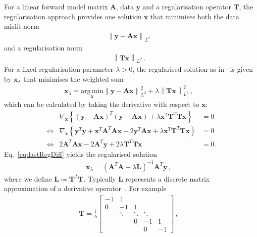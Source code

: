 For a linear forward model matrix $\bm{A}$, data $\bm{y}$ and a regularisation operator $\bm{T}$, the regularisation approach provides one solution $\bm{x}$ that minimises both the data misfit norm
\begin{align}
	\left\lVert \bm{y} - \bm{A} \bm{x} \right\rVert_{L^2}
\end{align} and a regularisation norm 
\begin{align}
	\left\lVert \bm{T} \bm{x} \right\rVert_{L^2} \, . \label{semiNorm}
\end{align}
For a fixed regularisation parameter $\lambda> 0 $, the regularised solution as in~\cite{hansen2010discrete, fox2016fast, tan2016LecNot} is given by $\bm{x}_{\lambda}$ that minimises the weighted sum
\begin{align}
	\bm{x}_{\lambda} = \underset{\bm{x}}{\mathrm{arg\,min}} \left\lVert \bm{y} - \bm{A} \bm{x} \right\rVert_{L^2}^2 + \lambda \left\lVert \bm{T} \bm{x} \right\rVert_{L^2}^2\, ,
\end{align}
which can be calculated by taking the derivative with respect to $\bm{x}$:
\begin{align}
	& & \nabla_{\bm{x}} \left\{ (\bm{y} - \bm{A} \bm{x})^T (\bm{y} - \bm{A} \bm{x}) + \lambda \bm{x}^T \bm{T}^T \bm{T} \bm{x} \right\} &= 0 \\
	&\iff & \nabla_{\bm{x}} \left\{ \bm{y}^T \bm{y} + \bm{x}^T \bm{A}^T \bm{A} \bm{x} - 2 \bm{y}^T \bm{A} \bm{x} + \lambda \bm{x}^T \bm{T}^T \bm{T} \bm{x} \right\} &= 0 \\
	&\iff & 2 \bm{A}^T \bm{A} \bm{x} - 2 \bm{A}^T \bm{y} + 2 \lambda \bm{T}^T \bm{T} \bm{x} &= 0 \label{eq:lastRegDiff}.
\end{align}
Eq.~\ref{eq:lastRegDiff} yields the regularised solution
\begin{align}
	\bm{x}_{\lambda} = (\bm{A}^T \bm{A} + \lambda \bm{L})^{-1} \bm{A}^T \bm{y} \, , \label{eq:regSol}
\end{align}
where we define $\bm{L} \coloneqq \bm{T}^T \bm{T}$.
Typically $\bm{L} $ represents a discrete matrix approximation of a derivative operator~\cite{tan2016LecNot}.
For example
\begin{align}
	\bm{T} = \frac{1}{h}
	\begin{bmatrix}
		-1 & 1 & & &  \\
		0 & -1 & 1 & &   \\
		& \ddots & \ddots & \ddots &\\ 
		& & 0 & -1 & 1  \\
		& & & 0 & -1 
	\end{bmatrix} \, ,
\end{align}
